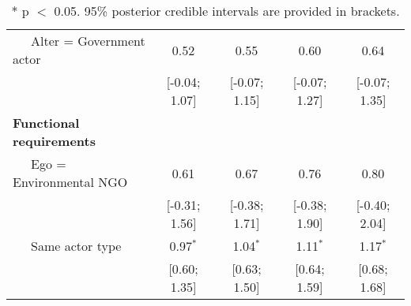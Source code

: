 \begin{table}[ht]
\begin{tabular}{lcccc}
  $\;\;\;\;$ Alter = Government actor & 0.52 & 0.55 & 0.60 & 0.64 \\ 
   & [-0.04; 1.07] & [-0.07; 1.15] & [-0.07; 1.27] & [-0.07; 1.35] \\ 
  \textbf{Functional requirements} &  &  &  &  \\ 
  $\;\;\;\;$ Ego = Environmental NGO & 0.61 & 0.67 & 0.76 & 0.80 \\ 
   & [-0.31; 1.56] & [-0.38; 1.71] & [-0.38; 1.90] & [-0.40; 2.04] \\ 
  $\;\;\;\;$ Same actor type & 0.97$^{\ast}$ & 1.04$^{\ast}$ & 1.11$^{\ast}$ & 1.17$^{\ast}$ \\ 
   & [0.60; 1.35] & [0.63; 1.50] & [0.64; 1.59] & [0.68; 1.68] \\ 
   \hline
\hline
\end{tabular}
\endgroup
\caption{* p $<$ 0.05. 95\% posterior credible intervals are provided in brackets.} 
\label{tab:regTable_ame}
\end{table}
